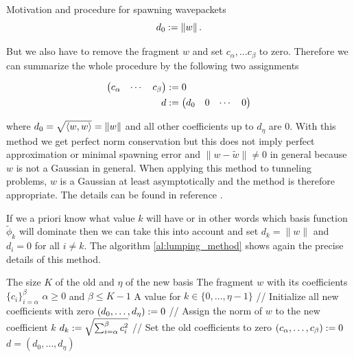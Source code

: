 \begin{chapter}{Motivation and procedure for spawning wavepackets}
\begin{equation}
  d_0 := \|w\| \,.
\end{equation}

But we also have to remove the fragment  $w$ and set $c_\alpha, \ldots c_\beta$
to zero. Therefore we can summarize the whole procedure by the following two
assignments

\begin{equation}
\begin{split}
  \begin{pmatrix}
    c_\alpha & \cdots & c_\beta
  \end{pmatrix} & := 0 \\
  d & :=
  \begin{pmatrix}
    d_0 & 0 & \cdots & 0
  \end{pmatrix}
\end{split}
\end{equation}

where $d_0 = \sqrt{\Braket{w,w}} = \|w\|$ and all other coefficients up to $d_\eta$
are 0. With this method we get perfect norm conservation but this does not imply
perfect approximation or minimal spawning error and $\|w - \tilde{w}\| \neq 0$ in
general because $w$ is not a Gaussian in general. When applying this method to
tunneling problems, $w$ is a Gaussian at least asymptotically and the method is
therefore appropriate. The details can be found in reference \cite{GHJ_tunneling_spawning}.

If we a priori know what value $k$ will have or in other words which basis function
$\tilde{\phi}_k$ will dominate then we can take this into account and set $d_k = \|w\|$
and $d_i = 0$ for all $i \neq k$. The algorithm \ref{al:lumping_method} shows
again the precise details of this method.

\begin{algorithm}
\caption{Lumping method for the change of basis}
\label{al:lumping_method}
\begin{algorithmic}
  \REQUIRE The size $K$ of the old and $\eta$ of the new basis
  \REQUIRE The fragment $w$ with its coefficients $\{c_i\}_{i=\alpha}^{\beta}$
  \REQUIRE $\alpha \geq 0$ and $\beta \leq K-1$
  \REQUIRE A value for $k \in \{0, \ldots, \eta-1\}$
  \STATE // Initialize all new coefficients with zero
  \STATE $\left(d_0, \ldots, d_{\eta}\right) := 0$
  \STATE // Assign the norm of $w$ to the new coefficient $k$
  \STATE $d_k := \sqrt{\sum_{i=\alpha}^\beta c_i^2}$
  \STATE // Set the old coefficients to zero
  \STATE $\left(c_\alpha, \ldots, c_\beta\right) := 0$
  \RETURN $d = \left(d_0, \ldots, d_{\eta}\right)$
\end{algorithmic}
\end{algorithm}


\end{chapter}
